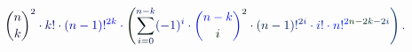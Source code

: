 \documentclass[12pt]{article}
\begin{document}
\makeatletter
\renewcommand*{\@textcolor}[3]{%
  \protect\leavevmode
  \begingroup
    \color#1{#2}#3%
  \endgroup
}
\makeatother
\begin{displaymath}
\mathcolor[RGB]{0,0,15}{\binom { \mathcolor[RGB]{0,0,30}{n} } { \mathcolor[RGB]{0,0,45}{k} } } ^ { \mathcolor[RGB]{0,0,60}{2} } \mathcolor[RGB]{0,0,75}{\cdot} \mathcolor[RGB]{0,0,90}{k} \mathcolor[RGB]{0,0,105}{!} \mathcolor[RGB]{0,0,120}{\cdot} \mathcolor[RGB]{0,0,135}{(} \mathcolor[RGB]{0,0,150}{n} \mathcolor[RGB]{0,0,165}{-} \mathcolor[RGB]{0,0,180}{1} \mathcolor[RGB]{0,0,195}{)} \mathcolor[RGB]{0,0,210}{!} ^ { \mathcolor[RGB]{0,0,225}{2} \mathcolor[RGB]{0,0,240}{k} } \mathcolor[RGB]{0,0,255}{\cdot} \mathcolor[RGB]{0,15,0}{\left(} \mathcolor[RGB]{0,15,15}{\sum} _ { \mathcolor[RGB]{0,15,30}{i} \mathcolor[RGB]{0,15,45}{=} \mathcolor[RGB]{0,15,60}{0} } ^ { \mathcolor[RGB]{0,15,75}{n} \mathcolor[RGB]{0,15,90}{-} \mathcolor[RGB]{0,15,105}{k} } \mathcolor[RGB]{0,15,120}{(} \mathcolor[RGB]{0,15,135}{-} \mathcolor[RGB]{0,15,150}{1} \mathcolor[RGB]{0,15,165}{)} ^ { \mathcolor[RGB]{0,15,180}{i} } \mathcolor[RGB]{0,15,195}{\cdot} \mathcolor[RGB]{0,15,210}{\binom { \mathcolor[RGB]{0,15,225}{n} \mathcolor[RGB]{0,15,240}{-} \mathcolor[RGB]{0,15,255}{k} } { \mathcolor[RGB]{0,30,0}{i} } } ^ { \mathcolor[RGB]{0,30,15}{2} } \mathcolor[RGB]{0,30,30}{\cdot} \mathcolor[RGB]{0,30,45}{(} \mathcolor[RGB]{0,30,60}{n} \mathcolor[RGB]{0,30,75}{-} \mathcolor[RGB]{0,30,90}{1} \mathcolor[RGB]{0,30,105}{)} \mathcolor[RGB]{0,30,120}{!} ^ { \mathcolor[RGB]{0,30,135}{2} \mathcolor[RGB]{0,30,150}{i} } \mathcolor[RGB]{0,30,165}{\cdot} \mathcolor[RGB]{0,30,180}{i} \mathcolor[RGB]{0,30,195}{!} \mathcolor[RGB]{0,30,210}{\cdot} \mathcolor[RGB]{0,30,225}{n} \mathcolor[RGB]{0,30,240}{!} ^ { \mathcolor[RGB]{0,30,255}{2} \mathcolor[RGB]{0,45,0}{n} \mathcolor[RGB]{0,45,15}{-} \mathcolor[RGB]{0,45,30}{2} \mathcolor[RGB]{0,45,45}{k} \mathcolor[RGB]{0,45,60}{-} \mathcolor[RGB]{0,45,75}{2} \mathcolor[RGB]{0,45,90}{i} } \mathcolor[RGB]{0,45,105}{\right)} \mathcolor[RGB]{0,45,120}{.}
\end{displaymath}
\end{document}
